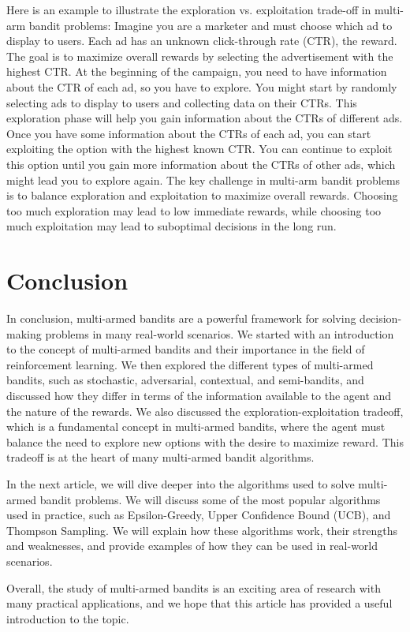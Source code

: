 \documentclass{article}
\begin{document}
Here is an example to illustrate the exploration vs. exploitation trade-off in multi-arm bandit problems:
Imagine you are a marketer and must choose which ad to display to users. Each ad has an unknown click-through rate (CTR), the reward. The goal is to maximize overall rewards by selecting the advertisement with the highest CTR.
At the beginning of the campaign, you need to have information about the CTR of each ad, so you have to explore. You might start by randomly selecting ads to display to users and collecting data on their CTRs. This exploration phase will help you gain information about the CTRs of different ads.
Once you have some information about the CTRs of each ad, you can start exploiting the option with the highest known CTR. You can continue to exploit this option until you gain more information about the CTRs of other ads, which might lead you to explore again.
The key challenge in multi-arm bandit problems is to balance exploration and exploitation to maximize overall rewards. Choosing too much exploration may lead to low immediate rewards, while choosing too much exploitation may lead to suboptimal decisions in the long run.

\section{Conclusion}
In conclusion, multi-armed bandits are a powerful framework for solving decision-making problems in many real-world scenarios. We started with an introduction to the concept of multi-armed bandits and their importance in the field of reinforcement learning. We then explored the different types of multi-armed bandits, such as stochastic, adversarial, contextual, and semi-bandits, and discussed how they differ in terms of the information available to the agent and the nature of the rewards. We also discussed the exploration-exploitation tradeoff, which is a fundamental concept in multi-armed bandits, where the agent must balance the need to explore new options with the desire to maximize reward. This tradeoff is at the heart of many multi-armed bandit algorithms.

In the next article, we will dive deeper into the algorithms used to solve multi-armed bandit problems. We will discuss some of the most popular algorithms used in practice, such as Epsilon-Greedy, Upper Confidence Bound (UCB), and Thompson Sampling. We will explain how these algorithms work, their strengths and weaknesses, and provide examples of how they can be used in real-world scenarios.

Overall, the study of multi-armed bandits is an exciting area of research with many practical applications, and we hope that this article has provided a useful introduction to the topic. 
\end{document}

